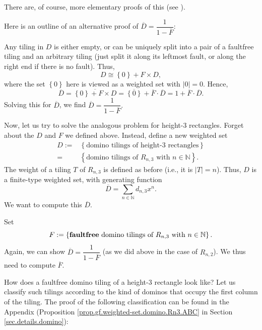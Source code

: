 There are, of course, more elementary proofs of this (see \cite[Proposition
1.1.11]{19fco}).

\begin{remark}
Here is an outline of an alternative proof of $\overline{D}=\dfrac
{1}{1-\overline{F}}$:

Any tiling in $D$ is either empty, or can be uniquely split into a pair of a
faultfree tiling and an arbitrary tiling (just split it along its leftmost
fault, or along the right end if there is no fault). Thus,%
\[
D\cong\left\{  0\right\}  +F\times D,
\]
where the set $\left\{  0\right\}  $ here is viewed as a weighted set with
$\left\vert 0\right\vert =0$. Hence,%
\[
\overline{D}=\overline{\left\{  0\right\}  +F\times D}=\overline{\left\{
0\right\}  }+\overline{F}\cdot\overline{D}=1+\overline{F}\cdot\overline{D}.
\]
Solving this for $\overline{D}$, we find $\overline{D}=\dfrac{1}%
{1-\overline{F}}.$
\end{remark}

Now, let us try to solve the analogous problem for height-$3$ rectangles.
Forget about the $D$ and $F$ we defined above. Instead, define a new weighted
set%
\begin{align*}
D:=  &  \left\{  \text{domino tilings of height-}3\text{ rectangles}\right\}
\\
=  &  \left\{  \text{domino tilings of }R_{n,3}\text{ with }n\in
\mathbb{N}\right\}  .
\end{align*}
The weight of a tiling $T$ of $R_{n,3}$ is defined as before (i.e., it is
$\left\vert T\right\vert =n$). Thus, $D$ is a finite-type weighted set, with
generating function%
\[
\overline{D}=\sum_{n\in\mathbb{N}}d_{n,3}x^{n}.
\]
We want to compute this $\overline{D}$.

Set%
\[
F:=\left\{  \text{\textbf{faultfree} domino tilings of }R_{n,3}\text{ with
}n\in\mathbb{N}\right\}  .
\]
Again, we can show $\overline{D}=\dfrac{1}{1-\overline{F}}$ (as we did above
in the case of $R_{n,2}$). We thus need to compute $\overline{F}$.

How does a faultfree domino tiling of a height-$3$ rectangle look like? Let us
classify such tilings according to the kind of dominos that occupy the first
column of the tiling. The proof of the following classification can be found
in the Appendix (Proposition \ref{prop.gf.weighted-set.domino.Rn3.ABC} in
Section \ref{sec.details.domino}):

